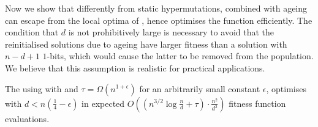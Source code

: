 \documentclass[lettersize,journal]{IEEEtran}
\begin{document}
% 
Now we show that differently from static hypermutations, {\expoHD }
combined with ageing can escape from the local optima of \cliff, 
hence optimises the function efficiently. The condition that $d$ is not prohibitively large is necessary to avoid
that the reinitialised solutions due to ageing have larger fitness than a solution with $n-d+1$ $1$-bits, {\color{blue} which would cause the latter to be removed from the population}.
We believe that this assumption is realistic for practical applications.

\begin{theorem}\label{thm:cliffexpo}
The {\oneoneOPTIA } using \IPHfcm{} with {\expoHD } and $\tau=\Omega(n^{1+\epsilon})$ 
for 
an arbitrarily small constant $\epsilon$,  optimises \cliff{} with 
$d<n(\frac{1}{4}-\epsilon)$ in expected {\color{blue} $O\left( \left(n^{3/2}\log{\frac{n}{d}}+\tau \right)\cdot \frac{n^2}{d^2}\right)$ }
 fitness function evaluations. 
\end{theorem}
\end{document}
